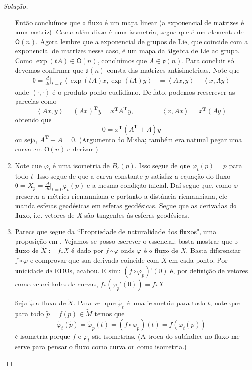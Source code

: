 \begin{proof}[Solução]
\begin{enumerate}[label=(\alph*)]
Então concluímos que o fluxo é um mapa linear (a exponencial de matrizes é uma matriz). Como além disso é uma isometria, segue que é um elemento de \(\mathsf{O}(n)\). Agora lembre que a exponencial de grupos de Lie, que coincide com a exponencial de matrizes nesse caso, é um mapa da álgebra de Lie ao grupo. Como \(\operatorname{exp}(tA)\in\mathsf{O}(n)\), concluímos que \(A \in \mathfrak{o}(n)\). Para concluir só devemos confirmar que \(\mathfrak{o}(n)\) consta das matrizes antisimetricas. Note que
\begin{align*}
0=\frac{d}{dt}\Big|_{t=0}\left<\operatorname{exp}(tA)x,\operatorname{exp}(tA)y\right>&=\left<Ax,y\right>+\left<x,Ay\right>
\end{align*}
onde \(\left<\cdot,\cdot\right>\) é o produto ponto euclidiano. De fato, podemos reescrever as parcelas como
\[\left<Ax,y\right>=(Ax)^{\mathbf{T}}y=x^{\mathbf{T}}A^{\mathbf{T}}y,\qquad \qquad \left<x,Ax\right>=x ^{\mathbf{T}}(Ay)\]
obtendo que
\[0=x ^{\mathbf{T}}(A^{\mathbf{T}}+A)y\]
ou seja, \(A^{\mathbf{T}}+A=0\). (Argumento do Misha; também era natural pegar uma curva em \(\mathsf{O}(n)\) e derivar.)
\item Note que \(\varphi_t\) é uma isometria de \(B_\varepsilon(p)\). Isso segue de que \(\varphi_t(p)=p\) para todo \(t\). Isso segue de que a curva constante \(p\) satisfaz a equação do fluxo \(0=X_p=\frac{d}{dt}\Big|_{t=0}\varphi_t(p)\) e a mesma condição inicial. Daí segue que, como \(\varphi\) preserva a métrica riemanniana e portanto a distância riemanniana, ele manda esferas geodésicas em esferas geodésicas. Segue que as derivadas do fluxo, i.e. vetores de \(X\) são tangentes às esferas geodésicas.
	
\item Parece que segue da ``Propriedade de naturalidade dos fluxos", uma proposição em \cite{les}. Vejamos se posso escrever o essencial: basta mostrar que o fluxo de  \(\tilde{X}:=f_*X\) é dado por \(f \circ \varphi\) onde \(\varphi\) é o fluxo de \(X\). Basta diferenciar \(f \circ \varphi\) e comprovar que sua derivada coincide com \(\tilde{X}\) em cada ponto. Por unicidade de EDOs, acabou. E sim: \((f \circ \varphi_p)'(0)\) é, por definição de vetores como velocidades de  curvas, \(f_*(\varphi_p'(0))=f_* X\).

	Seja \(\tilde{\varphi}\) o fluxo de \(\tilde{X}\). Para ver que \(\tilde{\varphi}_t\) é uma isometria para todo \(t\), note que para todo \(\tilde{p}=f(p)\in \tilde{M}\) temos que
	\[\tilde{\varphi}_t(\tilde{p})=\tilde{\varphi}_{\tilde{p}}(t)=(f \circ \varphi_{p})(t)=f(\varphi_t(p))\]
é isometria porque \(f\) e \(\varphi_t\) são isometrias. (A troca do subíndice no fluxo me serve para pensar o fluxo como curva ou como isometria.)


\end{enumerate}
\end{proof}
